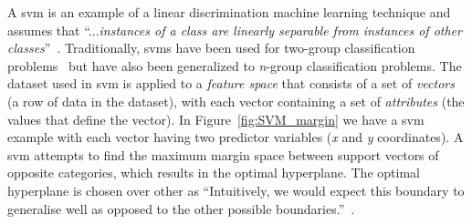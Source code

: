 A \gls{svm} is an example of a linear discrimination machine learning technique and assumes that ``...\emph{instances of a class are linearly separable from instances of other classes}''~\cite{ALP04}. Traditionally, \gls{svm}s have been used for two-group classification problems~\cite{CV95} but have also been generalized to \emph{n}-group classification problems. The dataset used in \gls{svm} is applied to a \emph{feature space} that consists of a set of \emph{vectors} (a row of data in the dataset), with each vector containing a set of \emph{attributes} (the values that define the vector). In Figure~\ref{fig:SVM_margin} we have a \gls{svm} example with each vector having two predictor variables (\emph{x} and \emph{y} coordinates). A \gls{svm} attempts to find the maximum margin space between support vectors of opposite categories, which results in the optimal hyperplane. The optimal hyperplane is chosen over other as ``Intuitively, we would expect this boundary to generalise well as opposed to the other possible boundaries.''~\cite{Gun98}.

